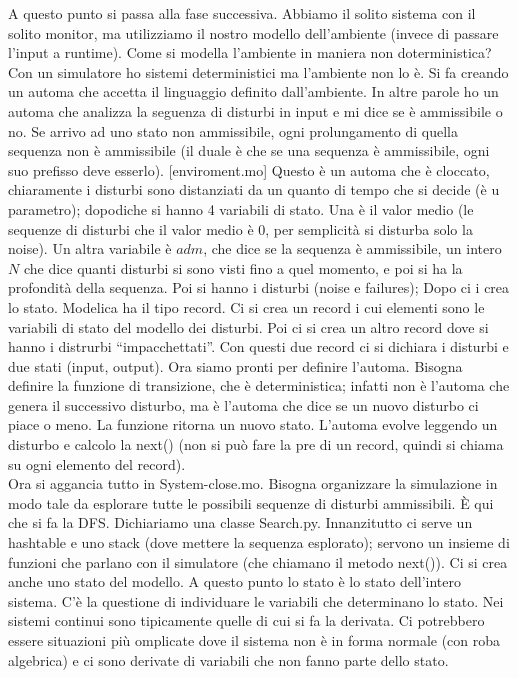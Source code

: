 \documentclass[a4paper, 11pt]{article}
\begin{document}
A questo punto si passa alla fase successiva. Abbiamo il solito sistema con il solito monitor, ma utilizziamo il nostro modello dell'ambiente (invece di passare l'input a runtime). Come si modella l'ambiente in maniera non doterministica? Con un simulatore ho sistemi deterministici ma l'ambiente non lo è. Si fa creando un automa che accetta il linguaggio definito dall'ambiente. In altre parole ho un automa che analizza la seguenza di disturbi in input e mi dice se è ammissibile o no. Se arrivo ad uno stato non ammissibile, ogni prolungamento di quella sequenza non è ammissibile (il duale è che se una sequenza è ammissibile, ogni suo prefisso deve esserlo). [enviroment.mo] Questo è un automa che è cloccato, chiaramente i disturbi sono distanziati da un quanto di tempo che si decide (è u parametro); dopodiche si hanno 4 variabili di stato. Una è il valor medio (le sequenze di disturbi che il valor medio è 0, per semplicità si disturba solo la noise). Un altra variabile è $adm$, che dice se la sequenza è ammissibile, un intero $N$ che dice quanti disturbi si sono visti fino a quel momento, e poi si ha la profondità della sequenza. Poi si hanno i disturbi (noise e failures); Dopo ci i crea lo stato. Modelica ha il tipo record. Ci si crea un record i cui elementi sono le variabili di stato del modello dei disturbi. Poi ci si crea un altro record dove si hanno i distrurbi ``impacchettati''. Con questi due record ci si dichiara i disturbi e due stati (input, output). Ora siamo pronti per definire l'automa. Bisogna definire la funzione di transizione, che è deterministica; infatti non è l'automa che genera il successivo disturbo, ma è l'automa che dice se un nuovo disturbo ci piace o meno. La funzione ritorna un nuovo stato. L'automa evolve leggendo un disturbo e calcolo la next() (non si può fare la pre di un record, quindi si chiama su ogni elemento del record).\\

Ora si aggancia tutto in System-close.mo. Bisogna organizzare la simulazione in modo tale da esplorare tutte le possibili sequenze di disturbi ammissibili. \`E qui che si fa la DFS. Dichiariamo una classe Search.py. Innanzitutto ci serve un hashtable e uno stack (dove mettere la sequenza esplorato); servono un insieme di funzioni che parlano con il simulatore (che chiamano il metodo next()). Ci si crea anche uno stato del modello. A questo punto lo stato è lo stato dell'intero sistema. C'è la questione di individuare le variabili che determinano lo stato. Nei sistemi continui sono tipicamente quelle di cui si fa la derivata. Ci potrebbero essere situazioni più omplicate dove il sistema non è in forma normale (con roba algebrica) e ci sono derivate di variabili che non fanno parte dello stato.\\
\end{document}
